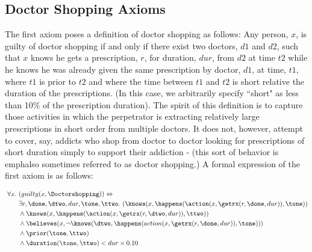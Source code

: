 \subsection{Doctor Shopping Axioms}

The first axiom poses a definition of doctor shopping as follows:  Any person, $x$, is guilty of doctor shopping if and only if there exist two doctors, $d1$ and $d2$, such that $x$ knows he gets a prescription, $r$, for duration, $dur$, from $d2$ at time $t2$ while he knows he was already given the same prescription by doctor, $d1$, at time, $t1$, where $t1$ is prior to $t2$ and where the time between $t1$ and $t2$ is short relative the duration of the prescriptions.  (In this case, we arbitrarily specify ``short" as less than 10\% of the prescription duration).  The spirit of this definition is to capture those activities in which the perpetrator is extracting relatively large prescriptions in short order from multiple doctors.  It does not, however, attempt to cover, say, addicts who shop from doctor to doctor looking for prescriptions of short duration simply to support their addiction - (this sort of behavior is emph{also} sometimes referred to as doctor shopping.)  A formal expression of the first axiom is as follows:


\begin{footnotesize}
\begin{align*}
[A1] \ \forall x . \ &(guilty(x, \Doctorshopping)) \Leftrightarrow \\
	& \exists r, \done, \dtwo, dur, \tone, \ttwo . \ (\knows(x,\happens(\action(x, \getrx(r, \done, dur)), \tone)) \\
	& \wedge \knows(x,\happens(\action(x,\getrx(r,\dtwo,dur)),\ttwo)) \\
	& \wedge \believes(x,\neg\knows(\dtwo,\happens(action(x,\getrx(r,\done,dur)),\tone))) \\
	& \wedge \prior(\tone, \ttwo) \\
	& \wedge \duration(\tone, \ttwo) < dur \times 0.10
\end{align*}
\end{footnotesize}


